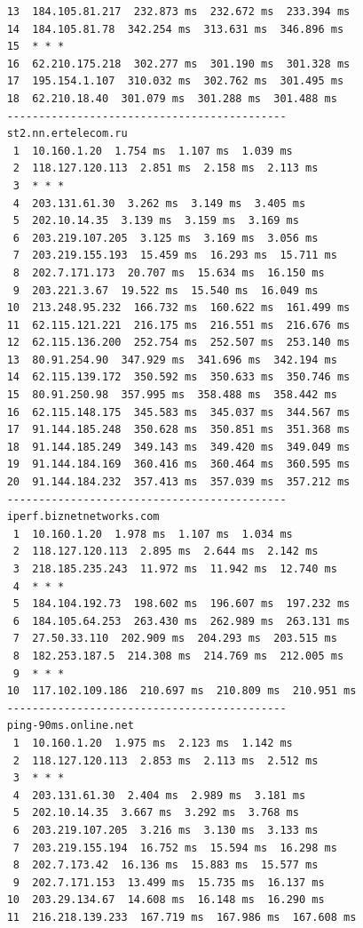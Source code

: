 \documentclass[paper=a4, fontsize=10pt]{scrartcl} %
\numberwithin{equation}{section} %
\numberwithin{figure}{section} %
\numberwithin{table}{section} %
\begin{document}
\begin{lstlisting}
    13  184.105.81.217  232.873 ms  232.672 ms  233.394 ms
    14  184.105.81.78  342.254 ms  313.631 ms  346.896 ms
    15  * * *
    16  62.210.175.218  302.277 ms  301.190 ms  301.328 ms
    17  195.154.1.107  310.032 ms  302.762 ms  301.495 ms
    18  62.210.18.40  301.079 ms  301.288 ms  301.488 ms
    --------------------------------------------
    st2.nn.ertelecom.ru
     1  10.160.1.20  1.754 ms  1.107 ms  1.039 ms
     2  118.127.120.113  2.851 ms  2.158 ms  2.113 ms
     3  * * *
     4  203.131.61.30  3.262 ms  3.149 ms  3.405 ms
     5  202.10.14.35  3.139 ms  3.159 ms  3.169 ms
     6  203.219.107.205  3.125 ms  3.169 ms  3.056 ms
     7  203.219.155.193  15.459 ms  16.293 ms  15.711 ms
     8  202.7.171.173  20.707 ms  15.634 ms  16.150 ms
     9  203.221.3.67  19.522 ms  15.540 ms  16.049 ms
    10  213.248.95.232  166.732 ms  160.622 ms  161.499 ms
    11  62.115.121.221  216.175 ms  216.551 ms  216.676 ms
    12  62.115.136.200  252.754 ms  252.507 ms  253.140 ms
    13  80.91.254.90  347.929 ms  341.696 ms  342.194 ms
    14  62.115.139.172  350.592 ms  350.633 ms  350.746 ms
    15  80.91.250.98  357.995 ms  358.488 ms  358.442 ms
    16  62.115.148.175  345.583 ms  345.037 ms  344.567 ms
    17  91.144.185.248  350.628 ms  350.851 ms  351.368 ms
    18  91.144.185.249  349.143 ms  349.420 ms  349.049 ms
    19  91.144.184.169  360.416 ms  360.464 ms  360.595 ms
    20  91.144.184.232  357.413 ms  357.039 ms  357.212 ms
    --------------------------------------------
    iperf.biznetnetworks.com
     1  10.160.1.20  1.978 ms  1.107 ms  1.034 ms
     2  118.127.120.113  2.895 ms  2.644 ms  2.142 ms
     3  218.185.235.243  11.972 ms  11.942 ms  12.740 ms
     4  * * *
     5  184.104.192.73  198.602 ms  196.607 ms  197.232 ms
     6  184.105.64.253  263.430 ms  262.989 ms  263.131 ms
     7  27.50.33.110  202.909 ms  204.293 ms  203.515 ms
     8  182.253.187.5  214.308 ms  214.769 ms  212.005 ms
     9  * * *
    10  117.102.109.186  210.697 ms  210.809 ms  210.951 ms
    --------------------------------------------
    ping-90ms.online.net
     1  10.160.1.20  1.975 ms  2.123 ms  1.142 ms
     2  118.127.120.113  2.853 ms  2.113 ms  2.512 ms
     3  * * *
     4  203.131.61.30  2.404 ms  2.989 ms  3.181 ms
     5  202.10.14.35  3.667 ms  3.292 ms  3.768 ms
     6  203.219.107.205  3.216 ms  3.130 ms  3.133 ms
     7  203.219.155.194  16.752 ms  15.594 ms  16.298 ms
     8  202.7.173.42  16.136 ms  15.883 ms  15.577 ms
     9  202.7.171.153  13.499 ms  15.735 ms  16.137 ms
    10  203.29.134.67  14.608 ms  16.148 ms  16.290 ms
    11  216.218.139.233  167.719 ms  167.986 ms  167.608 ms

\end{lstlisting}
\end{document}
